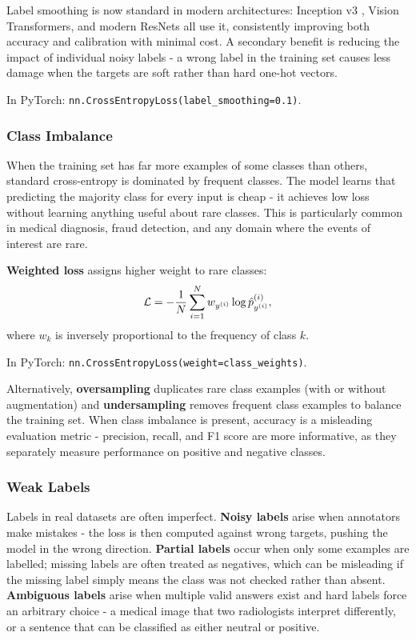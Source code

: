 Label smoothing is now standard in modern architectures: Inception v3 \parencite{Szegedy2016}, Vision Transformers, and modern ResNets all use it, consistently improving both accuracy and calibration with minimal cost.
A secondary benefit is reducing the impact of individual noisy labels - a wrong label in the training set causes less damage when the targets are soft rather than hard one-hot vectors.

In PyTorch: \texttt{nn.CrossEntropyLoss(label\_smoothing=0.1)}.

\subsubsection{Class Imbalance}

When the training set has far more examples of some classes than others, standard cross-entropy is dominated by frequent classes. The model learns that predicting the majority class for every input is cheap - it achieves low loss without learning anything useful about rare classes. This is particularly common in medical diagnosis, fraud detection, and any domain where the events of interest are rare.

\textbf{Weighted loss} assigns higher weight to rare classes:
\begin{equation}
    \mathcal{L} = -\frac{1}{N}\sum_{i=1}^{N} w_{y^{(i)}} \log \hat{p}_{y^{(i)}}^{(i)},
\end{equation}
where $w_k$ is inversely proportional to the frequency of class $k$. 

In PyTorch: \texttt{nn.CrossEntropyLoss(weight=class\_weights)}.

Alternatively, \textbf{oversampling} duplicates rare class examples (with or without augmentation) and \textbf{undersampling} removes frequent class examples to balance the training set. When class imbalance is present, accuracy is a misleading evaluation metric - precision, recall, and F1 score are more informative, as they separately measure performance on positive and negative classes.

\subsubsection{Weak Labels}

Labels in real datasets are often imperfect. \textbf{Noisy labels} arise when annotators make mistakes - the loss is then computed against wrong targets, pushing the model in the wrong direction. \textbf{Partial labels} occur when only some examples are labelled; missing labels are often treated as negatives, which can be misleading if the missing label simply means the class was not checked rather than absent. \textbf{Ambiguous labels} arise when multiple valid answers exist and hard labels force an arbitrary choice - a medical image that two radiologists interpret differently, or a sentence that can be classified as either neutral or positive.

